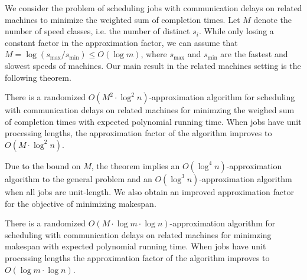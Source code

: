 We consider the problem of scheduling jobs with communication delays on related machines
to minimize the weighted sum of completion times.
Let $M$ denote the number of speed classes, i.e. the number of distinct $s_i$.
While only losing a constant factor in the approximation factor, we can assume that $M =\log(s_{\text{max}}/s_{\text{min}})\leq O(\log m)$,
where $s_{\text{max}}$ and $s_{\text{min}}$ are the fastest and slowest speeds of machines.
Our main result in the related machines setting is the following theorem.
\begin{theorem}
There is a randomized $O(M^2 \cdot \log^2 n)$-approximation algorithm for 
scheduling with communication delays on related machines for minimzing the weighed sum of completion times with expected polynomial running time. 
When jobs have unit processing lengths, the approximation factor of the algorithm improves to  $O(M \cdot \log^2 n )$.
\end{theorem}
Due to the bound on $M$, the theorem implies an $O(\log^4 n)$-approximation algorithm to the general problem and an $O(\log^3 n)$-approximation algorithm when all jobs are unit-length.
We also obtain an improved approximation factor for the objective of minimizing makespan.


\begin{theorem} \label{thm:colmain}
There is a randomized $O(M \cdot \log m \cdot \log n)$-approximation algorithm for 
scheduling with communication delays on related machines for minimzing makespan
with expected polynomial running time. When jobs have unit processing lengths the approximation factor of the algorithm improves to  $O(\log m \cdot \log n)$.
\end{theorem}



